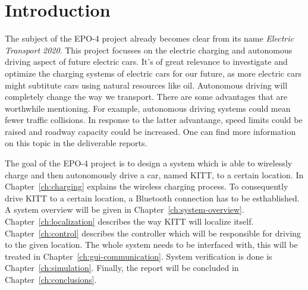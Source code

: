 \documentclass[11pt,titlepage]{report}
\begin{document}
\chapter{Introduction}
The subject of the EPO-4 project already becomes clear from its name \textit{Electric Transport 2020}. This project focusses on the electric charging and autonomous driving aspect of future electric cars. It's of great relevance to investigate and optimize the charging systems of electric cars for our future, as more electric cars might subtitute cars using natural resources like oil. Autonomous driving will completely change the way we transport. There are some advantages that are worthwhile mentioning. For example, autonomous driving systems could mean fewer traffic collisions. In response to the latter advantange, speed limits could be raised and roadway capacity could be increased. One can find more information on this topic in the deliverable reports. 

The goal of the EPO-4 project is to design a system which is able to wirelessly charge and then autonomously drive a car, named KITT, to a certain location. In Chapter~\ref{ch:charging} explains the wireless charging process. To consequently drive KITT to a certain location, a Bluetooth connection has to be esthablished. A system overview will be given in Chapter~\ref{ch:system-overview}. Chapter~\ref{ch:localization} describes the way KITT will localize itself. Chapter~\ref{ch:control} describes the controller which will be responsible for driving to the given location. The whole system needs to be interfaced with, this will be treated in Chapter~\ref{ch:gui-communication}. System verification is done is Chapter~\ref{ch:simulation}. Finally, the report will be concluded in Chapter~\ref{ch:conclusions}.
\end{document}
